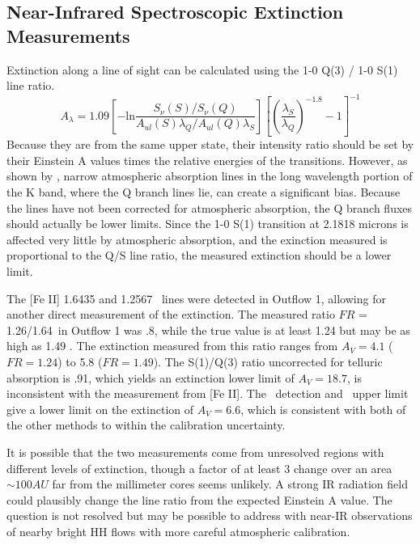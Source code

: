 \subsection{Near-Infrared Spectroscopic Extinction Measurements} 
Extinction along a line of sight can be calculated using the 1-0 Q(3) / 1-0 S(1) line ratio. 
\begin{equation}
    A_\lambda = 1.09 \left[ -\textrm{ln}
    \frac{S_\nu(S)/S_\nu(Q)}{A_{ul}(S)\lambda_Q/A_{ul}(Q) \lambda_S} \right] \left[
    \left(\frac{\lambda_S}{\lambda_Q}\right)^{-1.8} -1 \right]^{-1}
\end{equation}
Because they are from the same upper state,
their intensity ratio should be set by their Einstein A values times the
relative energies of the transitions.  %
However, as shown by
\citet{luhman1998}, narrow atmospheric absorption lines in the long wavelength
portion of the K band, where the Q branch lines lie, can create a significant
bias.  Because the lines have not been corrected for atmospheric absorption,
the Q branch fluxes should actually be lower limits.  Since the 1-0 S(1)
transition at 2.1818 microns is affected very little by atmospheric absorption,
and the exinction measured is proportional to the Q/S line ratio, the measured
extinction should be a lower limit.

The [Fe II] 1.6435 and 1.2567 \um\ lines were detected in Outflow 1, allowing for
another direct measurement of the extinction.  The measured ratio $FR$ =
1.26\um/1.64\um\ in Outflow 1 was .8, while the true value is at least 1.24 but
may be as high as 1.49 \citep{Smith2006,luhman1998,Giannini2008}.  The
extinction measured from this ratio ranges from $A_V = 4.1$ ($FR=1.24$) to 5.8
($FR=1.49$).  The S(1)/Q(3) ratio uncorrected for telluric absorption is .91,
which yields an extinction lower limit of $A_V = 18.7$, is inconsistent with
the measurement from [Fe II].  The \ha\ detection and \hb\ upper limit give a
lower limit on the extinction of $A_V = 6.6$, which is consistent with both of
the other methods to within the calibration uncertainty.  

It is possible that the two measurements come from unresolved regions with
different levels of extinction, though a factor of at least 3 change over an
area $\sim 100 AU$ far from the millimeter cores seems unlikely.  A strong IR
radiation field could plausibly change the line ratio from the expected
Einstein A value.  The question is not resolved but may be possible to address
with near-IR observations of nearby bright HH flows with more careful
atmospheric calibration.


